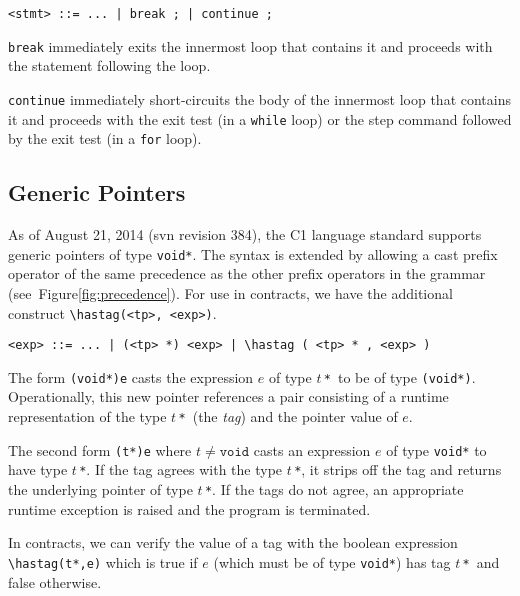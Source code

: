 \documentclass[11pt]{article}
\newcommand{\tstar}{\texttt{*}}
\newcommand{\tvoid}{\texttt{void}}
\begin{document}
\begin{small}
\begin{verbatim}
<stmt> ::= ... | break ; | continue ;
\end{verbatim}
\end{small}

\verb'break' immediately exits the innermost loop that contains
it and proceeds with the statement following the loop.

\verb'continue' immediately short-circuits the body of the
innermost loop that contains it and proceeds with the exit test (in a
\verb'while' loop) or the step command followed by the exit test
(in a \verb'for' loop).

\subsection{Generic Pointers}

As of August 21, 2014 (svn revision 384), the C1 language standard
supports generic pointers of type \verb'void*'.  The syntax is
extended by allowing a cast prefix operator of the same precedence as
the other prefix operators in the grammar
(see~Figure\ref{fig:precedence}).  For use in contracts, we have the
additional construct \verb'\hastag(<tp>, <exp>)'.

\begin{small}
\begin{verbatim}
<exp> ::= ... | (<tp> *) <exp> | \hastag ( <tp> * , <exp> )
\end{verbatim}
\end{small}

The form \verb'(void*)e' casts the expression $e$ of type $t$\,\tstar\
to be of type \verb'(void*)'.  Operationally, this new pointer
references a pair consisting of a runtime representation of the type
$t$\,\tstar\ (the \emph{tag}) and the pointer value of $e$.

The second form \verb'(t*)e' where $t \not= \tvoid$ casts an
expression $e$ of type \verb'void*' to have type $t$\,\tstar.  If the
tag agrees with the type $t$\,\tstar, it strips off the tag and
returns the underlying pointer of type $t$\,\tstar.  If the tags do
not agree, an appropriate runtime exception is raised and the program
is terminated.

In contracts, we can verify the value of a tag with the boolean
expression \verb'\hastag(t*,e)' which is true if $e$ (which must be of
type \verb'void*') has tag $t$\,\tstar\ and false otherwise.
\end{document}
